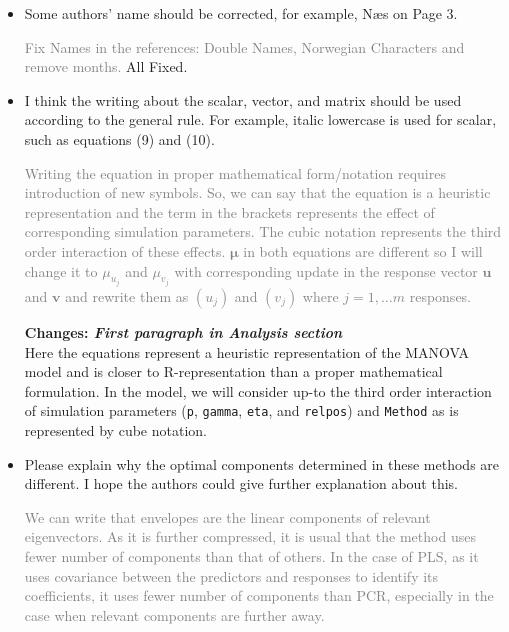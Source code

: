 \documentclass[12pt, a4paper]{scrartcl}
\begin{document}
\begin{itemize}
    
\item Some authors' name should be corrected, for example, N{\ae}s on Page 3.

\textcolor{gray}{Fix Names in the references: Double Names, Norwegian Characters and remove months.}
\textcolor{answers}{All Fixed.}

\item I think the writing about the scalar, vector, and matrix should be used according to the general rule. For example, italic lowercase is used for scalar, such as equations (9) and (10).

\textcolor{gray}{Writing the equation in proper mathematical form/notation requires introduction of new symbols. So, we can say that the equation is a heuristic representation and the term in the brackets represents the effect of corresponding simulation parameters. The cubic notation represents the third order interaction of these effects. $\boldsymbol{\mu}$ in both equations are different so I will change it to $\mu_{u_j}$ and $\mu_{v_j}$ with corresponding update in the response vector $\mathbf{u}$ and $\mathbf{v}$ and rewrite them as $(u_j)$ and $(v_j)$ where $j=1, \ldots m$ responses.}

\textcolor{mycolor1}{\textbf{Changes: \textit{First paragraph in Analysis section}}}\hfill \\
    \textcolor{answers}{Here the equations represent a heuristic representation of the MANOVA model and is closer to R-representation than a proper mathematical formulation. In the model, we will consider up-to the third order interaction of simulation parameters (\texttt{p}, \texttt{gamma}, \texttt{eta}, and \texttt{relpos}) and \texttt{Method} as is represented by cube notation.}

\item Please explain why the optimal components determined in these methods are different. I hope the authors could give further explanation about this.

\textcolor{gray}{We can write that envelopes are the linear components of relevant eigenvectors. As it is further compressed, it is usual that the method uses fewer number of components than that of others. In the case of PLS, as it uses covariance between the predictors and responses to identify its coefficients, it uses fewer number of components than PCR, especially in the case when relevant components are further away.}


\end{itemize}
\end{document}
